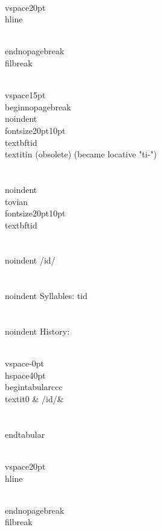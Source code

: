\\vspace{20pt}\\hline

\\end{nopagebreak}
\\filbreak



\\vspace{15pt}
\\begin{nopagebreak}
\\noindent{\\fontsize{20pt}{10pt}\\textbf{tid} } \\textit{in (obsolete)} (became locative "ti-")\\\\
\\noindent {\\tovian \\fontsize{20pt}{10pt} \\textbf{tid} }\\\\
\\noindent /{}{\textprimstress}id/\\\\
\\noindent Syllables: tid\\\\


\\noindent History:

\\vspace{-0pt}
\\hspace{40pt}
\\begin{tabular}{ccc}
\\textit{0} & /{}id/& \\\\
\\end{tabular}

\\vspace{20pt}\\hline

\\end{nopagebreak}
\\filbreak



